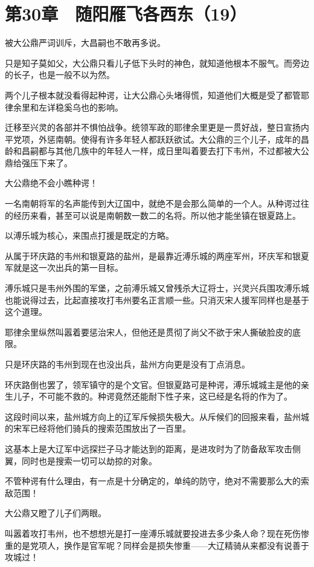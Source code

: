 \section{第30章　随阳雁飞各西东（19）}

被大公鼎严词训斥，大昌嗣也不敢再多说。

只是知子莫如父，大公鼎只看儿子低下头时的神色，就知道他根本不服气。而旁边的长子，也是一般不以为然。

两个儿子根本就没看得起种谔，让大公鼎心头堵得慌，知道他们大概是受了都管耶律余里和左详稳奚乌也的影响。

迁移至兴灵的各部并不惧怕战争。统领军政的耶律余里更是一贯好战，整日宣扬内平党项，外惩南朝。使得有许多年轻人都跃跃欲试。大公鼎的三个儿子，成年的昌龄和昌嗣都与其他几族中的年轻人一样，成日里叫着要去打下韦州，不过都被大公鼎给强压下来了。

大公鼎绝不会小瞧种谔！

一名南朝将军的名声能传到大辽国中，就绝不是会那么简单的一个人。从种谔过往的经历来看，甚至可以说是南朝数一数二的名将。所以他才能坐镇在银夏路上。

以溥乐城为核心，来围点打援是既定的方略。

从属于环庆路的韦州和银夏路的盐州，是最靠近溥乐城的两座军州，环庆军和银夏军就是这一次出兵的第一目标。

溥乐城只是韦州外围的军堡，之前溥乐城又曾残杀大辽将士，兴灵兴兵围攻溥乐城也能说得过去，比起直接攻打韦州要名正言顺一些。只消灭宋人援军同样也是基于这个道理。

耶律余里纵然叫嚣着要惩治宋人，但他还是贯彻了尚父不欲于宋人撕破脸皮的底限。

只是环庆路的韦州到现在也没出兵，盐州方向更是没有丁点消息。

环庆路倒也罢了，领军镇守的是个文官。但银夏路可是种谔，溥乐城城主是他的亲生儿子，不可能不救的。种谔竟然还能耐下性子来，这已经是名将的作为了。

这段时间以来，盐州城方向上的辽军斥候损失极大。从斥候们的回报来看，盐州城的宋军已经将他们骑兵的搜索范围放出了一百里。

这基本上是大辽军中远探拦子马才能达到的距离，是进攻时为了防备敌军攻击侧翼，同时也是搜索一切可以劫掠的对象。

不管种谔有什么理由，有一点是十分确定的，单纯的防守，绝对不需要那么大的索敌范围！

大公鼎又瞪了儿子们两眼。

叫嚣着攻打韦州，也不想想光是打一座溥乐城就要投进去多少条人命？现在死伤惨重的是党项人，换作是官军呢？同样会是损失惨重——大辽精骑从来都没有说善于攻城过！

